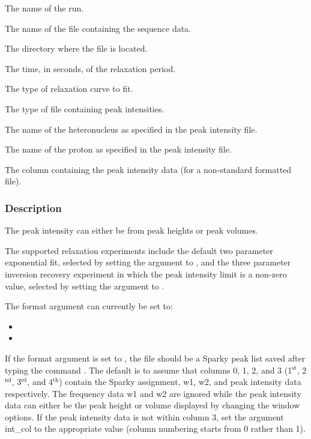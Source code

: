   The name of the run.

  The name of the file containing the sequence data.

  The directory where the file is located.

  The time, in seconds, of the relaxation period.

  The type of relaxation curve to fit.

  The type of file containing peak intensities.

  The name of the heteronucleus as specified in the peak intensity file.

  The name of the proton as specified in the peak intensity file.

  The column containing the peak intensity data (for a non-standard formatted file).

\subsubsection{Description}

The peak intensity can either be from peak heights or peak volumes.


The supported relaxation experiments include the default two parameter exponential fit,
selected by setting the 
 argument to 
, and the three parameter inversion
recovery experiment in which the peak intensity limit is a non-zero value, selected by
setting the argument to 
.


The format argument can currently be set to:
\begin{itemize}
\item[]     
\item[]     
\end{itemize}

If the format argument is set to 
, the file should be a Sparky peak list saved after
typing the command 
.  The default is to assume that columns 0, 1, 2, and 3 (1$^\mathrm{st}$, 2$^\mathrm{nd}$,
3$^\mathrm{rd}$, and 4$^\mathrm{th}$) contain the Sparky assignment, w1, w2, and peak intensity data respectively.
The frequency data w1 and w2 are ignored while the peak intensity data can either be the
peak height or volume displayed by changing the window options.  If the peak intensity data
is not within column 3, set the argument int\_col to the appropriate value (column numbering
starts from 0 rather than 1).

